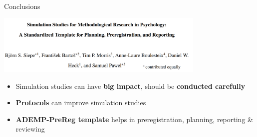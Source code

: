 \documentclass[english, 12pt, aspectratio=169]{beamer}
\begin{document}
\begin{frame}{Conclusions}

  \begin{block}{}
    \centering
    \includegraphics[width = 0.75\textwidth,frame]{pics/siepeetal.png}

    \begin{itemize}
    \pause
      \item Simulation studies can have \alert{\textbf{big impact}}, should be
            \alert{\textbf{conducted carefully}}
      \pause
      \item \alert{\textbf{Protocols}} can improve simulation studies
      \pause
      \item \alert{\textbf{ADEMP-PreReg template}} helps in preregistration,
            planning, reporting \& reviewing
      \pause
    \end{itemize}
  \end{block}

\end{frame}
\end{document}
